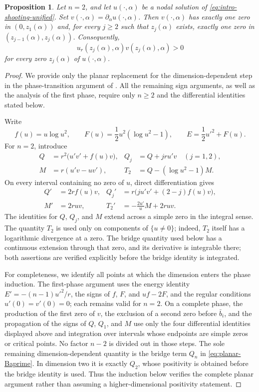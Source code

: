 \documentclass[11pt]{article}
\newtheorem{proposition}[theorem]{Proposition}
\begin{document}
\begin{proposition}\label{prop:log-planar}
Let $n=2$, and let $u(\cdot,\alpha)$ be a nodal solution of \eqref{eq:intro-shooting-unified}. Set $v(\cdot,\alpha)=\partial_\alpha u(\cdot,\alpha)$. Then $v(\cdot,\alpha)$ has exactly one zero in $(0,z_1(\alpha))$ and, for every $j\geq2$ such that $z_j(\alpha)$ exists, exactly one zero in $(z_{j-1}(\alpha),z_j(\alpha))$.
Consequently,
\begin{equation}\label{eq:planar-strict-zero-sign}
 u_r(z_j(\alpha),\alpha)v(z_j(\alpha),\alpha)>0
\end{equation}
for every zero $z_j(\alpha)$ of $u(\cdot,\alpha)$.
\end{proposition}

\begin{proof}
We provide only the planar replacement for the dimension-dependent step in the phase-transition argument of \cite[Section~3]{LiuSunZou}. All the remaining sign arguments, as well as the analysis of the first phase, require only $n\geq2$ and the differential identities stated below.

Write
\[
 f(u)=u\log u^2,
 \qquad
 F(u)=\frac12u^2(\log u^2-1),
 \qquad
 E=\frac12u'^2+F(u).
\]
For $n=2$, introduce
\begin{align*}
 Q&=r^2\bigl(u'v'+f(u)v\bigr),
 &Q_j&=Q+jru'v\quad(j=1,2),\\
 M&=r(u'v-uv'),
 &T_2&=Q-(\log u^2-1)M.
\end{align*}
On every interval containing no zero of $u$, direct differentiation gives
\begin{align*}
 Q'&=2rf(u)v,
 &Q_j'&=r\bigl(ju'v'+(2-j)f(u)v\bigr),\\
 M'&=2ruv,
 &T_2'&=-\frac{2u'}uM+2ruv.
\end{align*}
The identities for $Q$, $Q_j$, and $M$ extend across a simple zero in
the integral sense.  The quantity $T_2$ is used only on components of
$\{u\ne0\}$; indeed, $T_2$ itself has a logarithmic divergence at a
zero. The bridge quantity used below has a continuous extension through that
zero, and its derivative is integrable there; both assertions are verified
explicitly before the bridge identity is integrated.

For completeness, we identify all points at which the dimension enters the
phase induction.  The first-phase argument uses the energy identity
$E'=-(n-1)u'^2/r$, the signs of $f$, $F$, and $uf-2F$, and the regular
conditions $u'(0)=v'(0)=0$; each remains valid for $n=2$.  On a complete
phase, the production of the first zero of $v$, the exclusion of a second
zero before $\bar b_i$, and the propagation of the signs of $Q$, $Q_1$, and
$M$ use only the four differential identities displayed above and integration
over intervals whose endpoints are simple zeros or critical points.  No
factor $n-2$ is divided out in those steps.  The sole remaining
dimension-dependent quantity is the bridge term $Q_n$ in
\eqref{eq:planar-Baprime}.  In dimension two it is exactly $Q_2$, whose
positivity is obtained before the bridge identity is used.  Thus the
induction below verifies the complete planar argument rather than assuming a
higher-dimensional positivity statement.


\end{proof}
\end{document}
